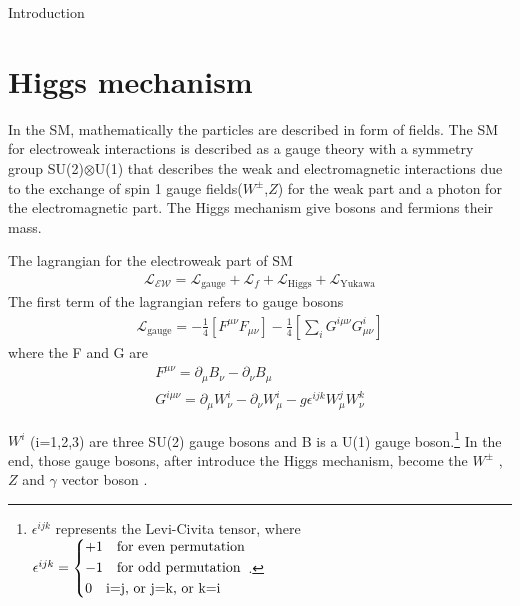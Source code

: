 \begin{chapter}{Introduction}
\pagebreak



\section{Higgs mechanism}
In the SM, mathematically the particles are described in form of fields. The SM for electroweak interactions is described as a gauge theory with a symmetry group SU(2)$\otimes$U(1)
that describes the weak and electromagnetic interactions
due to the exchange of spin 1 gauge fields($W^{\pm}$,$Z$) for the weak part and a photon for the electromagnetic part. The Higgs mechanism give bosons and fermions their mass. 

The lagrangian for the electroweak part of SM
\begin{align}\label{sml}
\mathcal{L_{\text{EW}}}=\mathcal{L}_\text{gauge}+\mathcal{L}_f +\mathcal{L}_\text{Higgs} + \mathcal{L}_\text{Yukawa}
\end{align}
The first term of the lagrangian refers to gauge bosons  
 \begin{align}\label{smg}
 \mathcal{L}_\text{gauge}=-\frac{1}{4}\left[F^{\mu\nu}F_{\mu\nu}\right]-\frac{1}{4}\left[\sum_{i}G^{i\mu\nu}G^i_{\mu\nu}\right]
 \end{align}
where  the  F and G  are 
\begin{align}
F^{\mu \nu}=\partial_\mu B_\nu -\partial_\nu B_\mu \\
G^{i\mu\nu}=\partial_\mu W^i_\nu -\partial_\nu W^i_\mu -g\epsilon^{ijk}W^j_\mu W^k_\nu 
\end{align}

$W^i$ (i=1,2,3) are three  SU(2) gauge bosons and B is a U(1) gauge boson.\footnote{$\epsilon^{ijk}$ represents the Levi-Civita tensor, where $\epsilon^{ijk}= \begin{dcases}
	+1 \quad  \text{for even permutation} \\
	-1 \quad \text{for odd permutation}\\
	0 \quad \text{i=j, or j=k, or k=i } 
	\end{dcases}$.} In the end, those gauge bosons, after introduce the Higgs mechanism, become the $W^\pm$ , $Z$ and $\gamma$ vector boson
\cite{ew1}\cite{ew2}. %
\\


\end{chapter}
